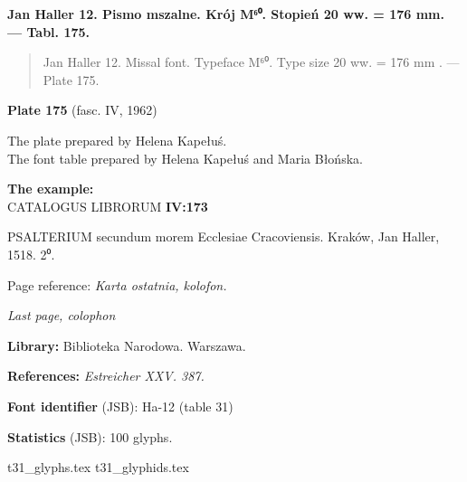 \documentclass[12pt]{article}
\newcommand{\bg}{\begingl}
\newcommand{\pismoPL}[1]{{\relsize{2}\Junicode\textbf{#1}}}
\newcommand{\pismoEN}[1]{{\relsize{1}\Junicode\begin{quote}#1\end{quote}}}
\newcommand{\plate}[3]{\textbf{Plate #1} (fasc. #2, #3)}
\newcommand{\exampleBib}[1]{{\relsize{2}\Junicode\textbf{The
      example:}\\[2ex] CATALOGUS LIBRORUM \textbf{#1}}}
\newcommand{\exampleBibExtra}[1]{{\relsize{2}\Junicode\textit{The
      plate contains also an example without a font table:}\\[2ex]
    CATALOGUS LIBRORUM \textbf{#1}}}
\newcommand{\exampleDesc}[1]{{\relsize{0}\Junicode#1}}
\newcommand{\exampleDig}[1]{{\relsize{0}\Junicode \textbf{Digitization(s) [JSB]:} #1}}
\newcommand{\exampleLib}[1]{{\relsize{0}\Junicode \textbf{Library:} #1}}
\newcommand{\examplePL}[1]{}
\newcommand{\exampleEN}[1]{}
\newcommand{\fontID}[2]{{\relsize{1}\Junicode\textbf{Font identifier} (JSB): #1 (table #2)}}
\newcommand{\fontstat}[1]{{\relsize{1}\Junicode\textbf{Statistics} (JSB): #1 glyphs.}}
\newcommand{\exampleRef}[1]{{\relsize{0}\Junicode \textbf{References:} #1}}
\newcommand{\examplePage}[1]{{Page reference: \relsize{0}\Junicode#1}}
\newcommand{\examplePageEN}[1]{{\relsize{0}\Junicode#1}}
\begin{document}
  \pismoPL{Jan Haller 12. Pismo mszalne. Krój M⁶⁰. Stopień 20 ww. = 176 mm. — Tabl. 175.}
  
  \pismoEN{Jan Haller 12. Missal font. Typeface M⁶⁰. Type size 20 ww. =
    176 mm . — Plate 175.}

\plate{175}{IV}{1962}

The plate prepared by Helena Kapełuś.\\
The font table prepared by Helena Kapełuś and Maria Błońska.

\bigskip

\exampleBib{IV:173}

\bigskip

\exampleDesc{PSALTERIUM secundum morem Ecclesiae Cracoviensis. Kraków, Jan Haller, 1518. 2⁰.}
  

\medskip
\examplePage{\textit{Karta ostatnia, kolofon.}}

\examplePageEN{\textit{Last page, colophon}}

  
  \bigskip
\exampleLib{Biblioteka Narodowa. Warszawa.}

\bigskip
\exampleRef{\textit{Estreicher XXV. 387.}}


\bigskip

\examplePL{Pismo 12. — Rubryki \chi{}, \lambda{}. — Cyfry 8.}

    \medskip

    \exampleEN{Font 12. — Rubric \chi{}, \lambda. — Digits 8.}


\bigskip

\bigskip


\fontID{Ha-12}{31}

\fontstat{100}

  {t31_glyphs.tex}
  {t31_glyphids.tex}

 







\end{document}
